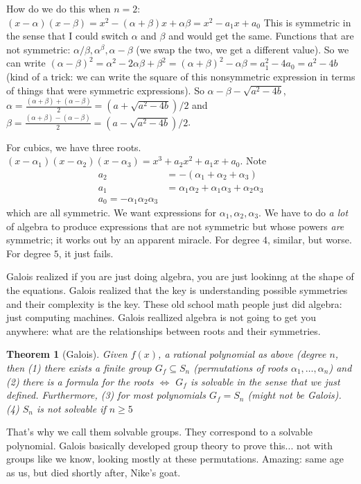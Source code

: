 \documentclass{article}
\theoremstyle{plain}
\newtheorem{theorem}{Theorem}
\theoremstyle{remark}
\begin{document}
How do we do this when $n=2$: $(x - \alpha)(x - \beta) = x^2 - (\alpha+\beta)x + \alpha\beta
= x^2 - a_1x + a_0$
This is symmetric in the sense that I could switch $\alpha$ and $\beta$
and would get the same.
Functions that are not symmetric: $\alpha/\beta, \alpha^\beta, \alpha-\beta$
(we swap the two, we get a different value).
So we can write $(\alpha-\beta)^2 = \alpha^2 - 2\alpha\beta + \beta^2
= (\alpha+\beta)^2 - \alpha\beta = a_1^2 - 4a_0 = a^2-4b$
(kind of a trick: we can write the square of this nonsymmetric expression
in terms of things that were symmetric expressions).
So $\alpha-\beta - \sqrt{a^2 -4b}$,
$\alpha  = \frac{(\alpha+\beta)+(\alpha-\beta)}{2} = (a + \sqrt{a^2-4b})/2$
and $\beta  = \frac{(\alpha+\beta)-(\alpha-\beta)}{2} = (a - \sqrt{a^2-4b})/2$.

For cubics, we have three roots.
$(x - \alpha_1)(x-\alpha_2)(x-\alpha_3) = x^3 + a_2x^2 + a_1x + a_0$.
Note
\begin{align*}
	a_2 &= -(\alpha_1 + \alpha_2 + \alpha_3)\\
	a_1 &= \alpha_1\alpha_2 + \alpha_1\alpha_3 + \alpha_2\alpha_3\\
	a_0 = -\alpha_1\alpha_2\alpha_3
\end{align*}
which are all symmetric.
We want expressions for $\alpha_1,\alpha_2,\alpha_3$.
We have to do \emph{a lot} of algebra to produce expressions
that are not symmetric but whose powers \emph{are} symmetric;
it works out by an apparent miracle.
For degree $4$, similar, but worse.
For degree $5$, it just fails.

Galois realized if you are just doing algebra,
you are just lookinng at the shape of the equations.
Galois realized that the key is understanding possible symmetries
and their complexity is the key.
These old school math people just did algebra: just computing machines.
Galois reallized algebra is not going to get you anywhere:
what are the relationships between roots and their symmetries.

\begin{theorem}[Galois]
	Given $f(x)$, a rational polynomial as above (degree $n$,
	then (1) there exists a finite group $G_f \subseteq S_n$
	(permutations of roots $\alpha_1,\dots,\alpha_n$)
	and (2) there is a formula for the roots $\iff$
	$G_f$ is solvable in the sense that we just defined.
	Furthermore, (3) for most polynomials $G_f = S_n$ (might not be Galois).
	(4) $S_n$ is not solvable if $n \geq 5$
\end{theorem}
That's why we call them solvable groups.
They correspond to a solvable polynomial.
Galois basically developed group theory to prove this...
not with groups like we know, looking mostly at these permutations.
Amazing: same age as us, but died shortly after, Nike's goat.
\end{document}
